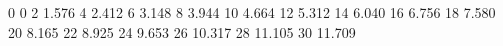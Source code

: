 0 0
2	1.576
4	2.412
6	3.148
8	3.944
10	4.664
12	5.312
14	6.040
16	6.756
18	7.580
20	8.165
22	8.925
24	9.653
26	10.317
28	11.105
30	11.709
